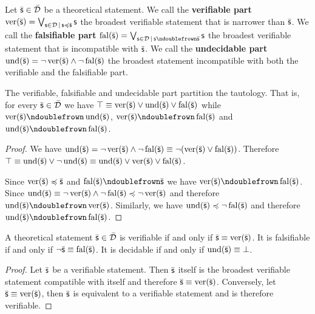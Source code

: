 \documentclass[11pt,letterpaper,fleqn]{memoir} %
\begin{document}
\begin{mathSection}
	\begin{defn}
		Let $\bar{\mathsf{s}} \in \bar{\mathcal{D}}$ be a theoretical statement. We call the \textbf{verifiable part} $\operatorname{ver}(\bar{\mathsf{s}}) = \bigvee_{\mathsf{s} \in \mathcal{D} \, | \, \mathsf{s} \preccurlyeq \bar{\mathsf{s}}} \mathsf{s}$ the broadest verifiable statement that is narrower than $\bar{\mathsf{s}}$. We call the \textbf{falsifiable part} $\fal(\bar{\stmt}) = \bigOR_{\stmt \in \edomain \, | \, \stmt \ncomp \bar{\stmt}} \stmt$ the broadest verifiable statement that is incompatible with $\bar{\mathsf{s}}$. We call the \textbf{undecidable part} $\operatorname{und}(\bar{\mathsf{s}}) = \neg \operatorname{ver}(\bar{\mathsf{s}}) \wedge \neg \operatorname{fal}(\bar{\mathsf{s}})$ the broadest statement incompatible with both the verifiable and the falsifiable part.
	\end{defn}

\begin{coro}
	The verifiable, falsifiable and undecidable part partition the tautology. That is, for every $\bar{\mathsf{s}} \in \bar{\mathcal{D}}$ we have $\top \equiv \operatorname{ver}(\bar{\mathsf{s}}) \vee \operatorname{und}(\bar{\mathsf{s}}) \vee \operatorname{fal}(\bar{\mathsf{s}})$ while $\ver(\bar{\stmt}) \ncomp \und(\bar{\stmt})$, $\ver(\bar{\stmt}) \ncomp \fal(\bar{\stmt})$ and $\und(\bar{\stmt}) \ncomp \fal(\bar{\stmt})$.
\end{coro}
	
\begin{proof}
	We have $\operatorname{und}(\bar{\mathsf{s}}) = \neg \operatorname{ver}(\bar{\mathsf{s}}) \wedge \neg \operatorname{fal}(\bar{\mathsf{s}}) \equiv \neg (\operatorname{ver}(\bar{\mathsf{s}}) \vee \operatorname{fal}(\bar{\mathsf{s}}))$. Therefore $\top \equiv \operatorname{und}(\bar{\mathsf{s}}) \vee \neg \operatorname{und}(\bar{\mathsf{s}}) \equiv \operatorname{und}(\bar{\mathsf{s}}) \vee \operatorname{ver}(\bar{\mathsf{s}}) \vee \operatorname{fal}(\bar{\mathsf{s}})$.
	
	Since $\operatorname{ver}(\bar{\mathsf{s}}) \preccurlyeq \bar{\mathsf{s}}$ and $\fal(\bar{\stmt}) \ncomp \bar{\stmt}$ we have $\ver(\bar{\stmt}) \ncomp \fal(\bar{\stmt})$. Since $\operatorname{und}(\bar{\mathsf{s}}) \equiv \neg \operatorname{ver}(\bar{\mathsf{s}}) \wedge \neg \operatorname{fal}(\bar{\mathsf{s}}) \preccurlyeq \neg \operatorname{ver}(\bar{\mathsf{s}})$ and therefore $\und(\bar{\stmt}) \ncomp \ver(\bar{\stmt})$. Similarly, we have $\operatorname{und}(\bar{\mathsf{s}}) \preccurlyeq \neg \operatorname{fal}(\bar{\mathsf{s}})$ and therefore $\und(\bar{\stmt}) \ncomp \fal(\bar{\stmt})$.
\end{proof}
	
\begin{coro}
	A theoretical statement $\bar{\mathsf{s}} \in \bar{\mathcal{D}}$ is verifiable if and only if $\bar{\mathsf{s}} \equiv \operatorname{ver}(\bar{\mathsf{s}})$. It is falsifiable if and only if $\neg\bar{\mathsf{s}} \equiv \operatorname{fal}(\bar{\mathsf{s}})$. It is decidable if and only if $\operatorname{und}(\bar{\mathsf{s}}) \equiv \bot$.
\end{coro}
\begin{proof}
	Let $\bar{\mathsf{s}}$ be a verifiable statement. Then $\bar{\mathsf{s}}$ itself is the broadest verifiable statement compatible with itself and therefore $\bar{\mathsf{s}} \equiv \operatorname{ver}(\bar{\mathsf{s}})$. Conversely, let $\bar{\mathsf{s}} \equiv \operatorname{ver}(\bar{\mathsf{s}})$, then $\bar{\mathsf{s}}$ is equivalent to a verifiable statement and is therefore verifiable.
	

\end{proof}
\end{mathSection}
\end{document}
